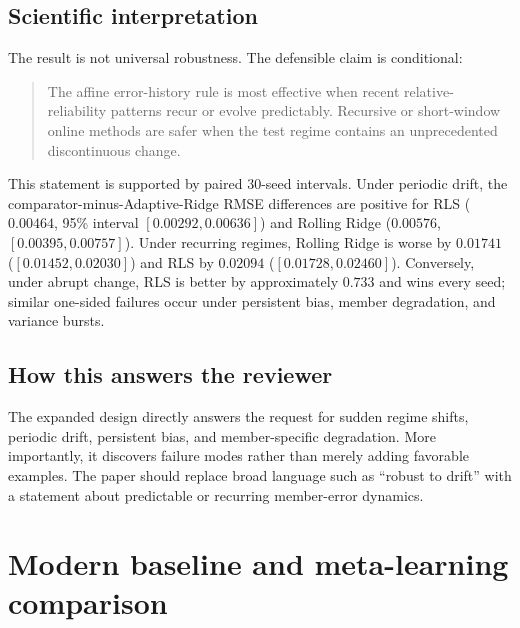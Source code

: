 \documentclass[10pt]{report}
\begin{document}
\section{Scientific interpretation}
The result is not universal robustness. The defensible claim is conditional:
\begin{quote}
The affine error-history rule is most effective when recent relative-reliability patterns recur or evolve predictably. Recursive or short-window online methods are safer when the test regime contains an unprecedented discontinuous change.
\end{quote}
This statement is supported by paired 30-seed intervals. Under periodic drift, the comparator-minus-Adaptive-Ridge RMSE differences are positive for RLS ($0.00464$, 95\% interval $[0.00292,0.00636]$) and Rolling Ridge ($0.00576$, $[0.00395,0.00757]$). Under recurring regimes, Rolling Ridge is worse by $0.01741$ ($[0.01452,0.02030]$) and RLS by $0.02094$ ($[0.01728,0.02460]$). Conversely, under abrupt change, RLS is better by approximately $0.733$ and wins every seed; similar one-sided failures occur under persistent bias, member degradation, and variance bursts.

\section{How this answers the reviewer}
The expanded design directly answers the request for sudden regime shifts, periodic drift, persistent bias, and member-specific degradation. More importantly, it discovers failure modes rather than merely adding favorable examples. The paper should replace broad language such as ``robust to drift'' with a statement about predictable or recurring member-error dynamics.

\chapter{Modern baseline and meta-learning comparison}
\end{document}

